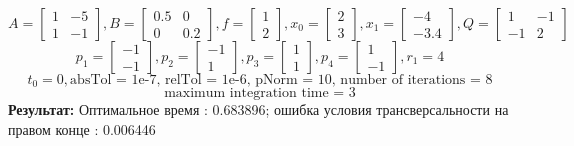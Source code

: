 \documentclass[10pt]{article}
\begin{document}
 \[ A = \begin{bmatrix}
      		1 & -5 \\[0.3em]
      		1 & -1
      	  \end{bmatrix} , 
 B = \begin{bmatrix}
      	   0.5 & 0 \\[0.3em]
      	   0 & 0.2
      \end{bmatrix} ,
 f = \begin{bmatrix}
       	    1 \\[0.3em]
      	    2
      \end{bmatrix} ,
 x_0 = \begin{bmatrix}
      	    2 \\[0.3em]
      	    3
      \end{bmatrix} ,
 x_1 = \begin{bmatrix}
      	-4 \\[0.3em]
      	-3.4
      \end{bmatrix} ,
 Q = \begin{bmatrix}
      	   1 & -1 \\[0.3em]
      	   -1 & 2
      \end{bmatrix} \]
\[ p_1 = \begin{bmatrix}
      	-1 \\[0.3em]
      	-1
      \end{bmatrix} ,
p_2 = \begin{bmatrix}
      	-1 \\[0.3em]
      	1
      \end{bmatrix} ,
p_3 = \begin{bmatrix}
      	1 \\[0.3em]
      	1
      \end{bmatrix} ,
p_4 = \begin{bmatrix}
      	1 \\[0.3em]
      	-1
      \end{bmatrix}, r_1 = 4 \]
\[ t_0 = 0, \text{absTol = 1e-7, relTol = 1e-6, pNorm = 10, number of iterations = 8}\]  
\[\text{maximum integration time = 3} \]
\textbf{Результат:} Оптимальное время : 0.683896; ошибка условия трансверсальности на правом конце : 0.006446 
\medskip\\
\end{document}
